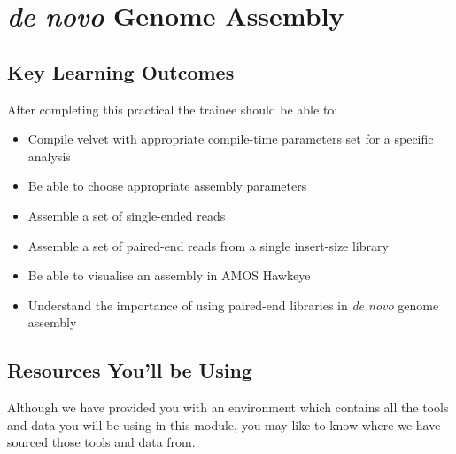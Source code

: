 \renewcommand{\moduleTitle}{\textit{de novo} Genome Assembly}
\renewcommand{\moduleAuthors}{%
  Matthias Haimel \mailto{mhaimel@ebi.ac.uk}\\
  Nathan S. Watson-Haigh \mailto{nathan.watson-haigh@awri.com.au}
} \renewcommand{\moduleContributions}{%
  
}

\chapter{\moduleTitle}
\newpage

\section{Key Learning Outcomes}

After completing this practical the trainee should be able to:
\begin{itemize}
  \item Compile velvet with appropriate compile-time parameters set for a specific analysis
  \item Be able to choose appropriate assembly parameters
  \item Assemble a set of single-ended reads
  \item Assemble a set of paired-end reads from a single insert-size library
  \item Be able to visualise an assembly in AMOS Hawkeye
  \item Understand the importance of using paired-end libraries in \textit{de
        novo} genome assembly
\end{itemize}

\section{Resources You'll be Using}
Although we have provided you with an environment which contains all the tools
and data you will be using in this module, you may like to know where we have
sourced those tools and data from.
 

